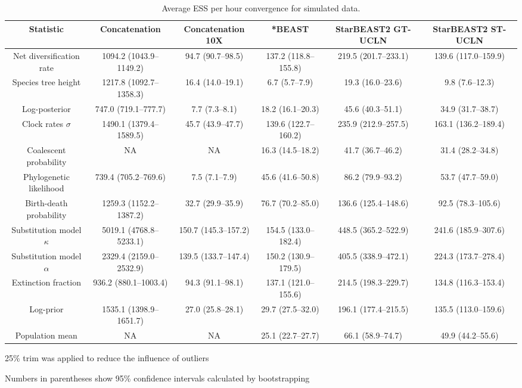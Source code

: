 \documentclass[12pt]{article}
\begin{document}
\begin{landscape}
\clearpage

\begin{table}[htb!]
\centering
\caption{Average ESS per hour convergence for simulated data.}
\label{tab:simulatedPerHour}
\begin{threeparttable}
\begin{adjustbox}{center}
\renewcommand{\arraystretch}{1.2}
\footnotesize
\begin{tabular}{|c|c|c|c|c|c|}
\multicolumn{1}{c}{Statistic} & \multicolumn{1}{c}{Concatenation} & \multicolumn{1}{c}{Concatenation 10X} & \multicolumn{1}{c}{*BEAST} & \multicolumn{1}{c}{StarBEAST2 GT-UCLN} & \multicolumn{1}{c}{StarBEAST2 ST-UCLN}\tabularnewline
\hline
Net diversification rate & 1094.2 (1043.9--1149.2) & 94.7 (90.7--98.5) & 137.2 (118.8--155.8) & 219.5 (201.7--233.1) & 139.6 (117.0--159.9)\tabularnewline
\hline
Species tree height & 1217.8 (1092.7--1358.3) & 16.4 (14.0--19.1) & 6.7 (5.7--7.9) & 19.3 (16.0--23.6) & 9.8 (7.6--12.3)\tabularnewline
\hline
Log-posterior & 747.0 (719.1--777.7) & 7.7 (7.3--8.1) & 18.2 (16.1--20.3) & 45.6 (40.3--51.1) & 34.9 (31.7--38.7)\tabularnewline
\hline
Clock rates $\sigma$ & 1490.1 (1379.4--1589.5) & 45.7 (43.9--47.7) & 139.6 (122.7--160.2) & 235.9 (212.9--257.5) & 163.1 (136.2--189.4)\tabularnewline
\hline
Coalescent probability & NA & NA & 16.3 (14.5--18.2) & 41.7 (36.7--46.2) & 31.4 (28.2--34.8)\tabularnewline
\hline
Phylogenetic likelihood & 739.4 (705.2--769.6) & 7.5 (7.1--7.9) & 45.6 (41.6--50.8) & 86.2 (79.9--93.2) & 53.7 (47.7--59.0)\tabularnewline
\hline
Birth-death probability & 1259.3 (1152.2--1387.2) & 32.7 (29.9--35.9) & 76.7 (70.2--85.0) & 136.6 (125.4--148.6) & 92.5 (78.3--105.6)\tabularnewline
\hline
Substitution model $\kappa$ & 5019.1 (4768.8--5233.1) & 150.7 (145.3--157.2) & 154.5 (133.0--182.4) & 448.5 (365.2--522.9) & 241.6 (185.9--307.6)\tabularnewline
\hline
Substitution model $\alpha$ & 2329.4 (2159.0--2532.9) & 139.5 (133.7--147.4) & 150.2 (130.9--179.5) & 405.5 (338.9--472.1) & 224.3 (173.7--278.4)\tabularnewline
\hline
Extinction fraction & 936.2 (880.1--1003.4) & 94.3 (91.1--98.1) & 137.1 (121.0--155.6) & 214.5 (198.3--229.7) & 134.8 (116.3--153.4)\tabularnewline
\hline
Log-prior & 1535.1 (1398.9--1651.7) & 27.0 (25.8--28.1) & 29.7 (27.5--32.0) & 196.1 (177.4--215.5) & 135.5 (113.0--159.6)\tabularnewline
\hline
Population mean & NA & NA & 25.1 (22.7--27.7) & 66.1 (58.9--74.7) & 49.9 (44.2--55.6)\tabularnewline
\hline
\end{tabular}
\end{adjustbox}
\begin{tablenotes}
\footnotesize
\item 25\% trim was applied to reduce the influence of outliers
\item Numbers in parentheses show 95\% confidence intervals calculated by bootstrapping
\end{tablenotes}
\end{threeparttable}
\end{table}


\end{landscape}
\end{document}
